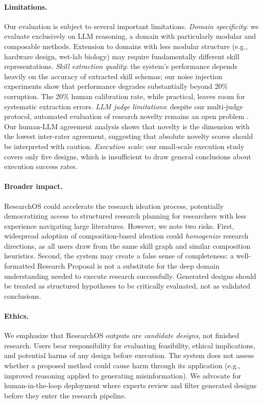 \paragraph{Limitations.}
Our evaluation is subject to several important limitations. \emph{Domain specificity}: we evaluate exclusively on LLM reasoning, a domain with particularly modular and composable methods. Extension to domains with less modular structure (e.g., hardware design, wet-lab biology) may require fundamentally different skill representations. \emph{Skill extraction quality}: the system's performance depends heavily on the accuracy of extracted skill schemas; our noise injection experiments show that performance degrades substantially beyond 20\% corruption. The 20\% human calibration rate, while practical, leaves room for systematic extraction errors. \emph{LLM judge limitations}: despite our multi-judge protocol, automated evaluation of research novelty remains an open problem \cite{si2024llmideas}. Our human-LLM agreement analysis shows that novelty is the dimension with the lowest inter-rater agreement, suggesting that absolute novelty scores should be interpreted with caution. \emph{Execution scale}: our small-scale execution study covers only five designs, which is insufficient to draw general conclusions about execution success rates.

\paragraph{Broader impact.}
ResearchOS could accelerate the research ideation process, potentially democratizing access to structured research planning for researchers with less experience navigating large literatures. However, we note two risks. First, widespread adoption of composition-based ideation could \emph{homogenize} research directions, as all users draw from the same skill graph and similar composition heuristics. Second, the system may create a false sense of completeness: a well-formatted Research Proposal is not a substitute for the deep domain understanding needed to execute research successfully. Generated designs should be treated as structured hypotheses to be critically evaluated, not as validated conclusions.

\paragraph{Ethics.}
We emphasize that ResearchOS outputs are \emph{candidate designs}, not finished research. Users bear responsibility for evaluating feasibility, ethical implications, and potential harms of any design before execution. The system does not assess whether a proposed method could cause harm through its application (e.g., improved reasoning applied to generating misinformation). We advocate for human-in-the-loop deployment where experts review and filter generated designs before they enter the research pipeline.
